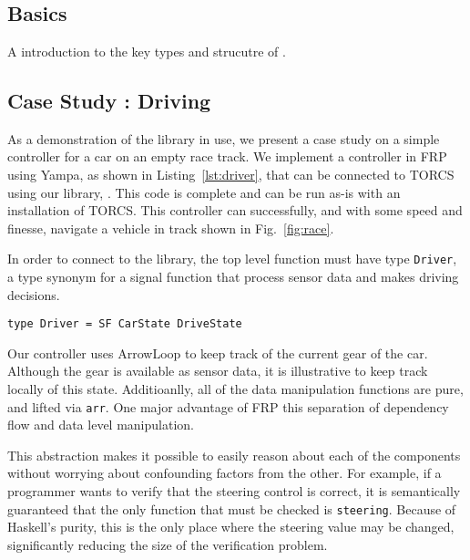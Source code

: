 \section{\ourLib}

\subsection{Basics}

A introduction to the key types and strucutre of \ourLib.

\subsection{Case Study : Driving}

As a demonstration of the \ourLib library in use, we present a case study on a simple controller for a car on an empty race track.
We implement a controller in FRP using Yampa, as shown in Listing~\ref{lst:driver}, that can be connected to TORCS using our library, \ourLib.
This code is complete and can be run as-is with an installation of TORCS.
This controller can successfully, and with some speed and finesse, navigate a vehicle in track shown in Fig.~\ref{fig:race}.

In order to connect to the library, the top level function must have type \texttt{Driver}, a type synonym for a signal function that process sensor data and makes driving decisions.

\begin{lstlisting}
type Driver = SF CarState DriveState
\end{lstlisting}

Our controller uses ArrowLoop to keep track of the current gear of the car.
Although the gear is available as sensor data, it is illustrative to keep track locally of this state.
Additioanlly, all of the data manipulation functions are pure, and lifted via \texttt{arr}.
One major advantage of FRP this separation of dependency flow and data level manipulation. 

This abstraction makes it possible to easily reason about each of the components without worrying about confounding factors from the other.
For example, if a programmer wants to verify that the steering control is correct, it is semantically guaranteed that the only function that must be checked is \texttt{steering}.
Because of Haskell's purity, this is the only place where the steering value may be changed, significantly reducing the size of the verification problem.

